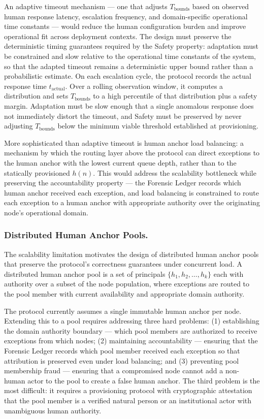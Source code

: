 An adaptive timeout mechanism — one that adjusts $T_{\mathrm{bounds}}$ based on observed human response latency, escalation frequency, and domain-specific operational time constants — would reduce the human configuration burden and improve operational fit across deployment contexts. The design must preserve the deterministic timing guarantees required by the Safety property: adaptation must be constrained and slow relative to the operational time constants of the system, so that the adapted timeout remains a deterministic upper bound rather than a probabilistic estimate. On each escalation cycle, the protocol records the actual response time $t_{\mathrm{actual}}$. Over a rolling observation window, it computes a distribution and sets $T_{\mathrm{bounds}}$ to a high percentile of that distribution plus a safety margin. Adaptation must be slow enough that a single anomalous response does not immediately distort the timeout, and Safety must be preserved by never adjusting $T_{\mathrm{bounds}}$ below the minimum viable threshold established at provisioning.

More sophisticated than adaptive timeout is human anchor load balancing: a mechanism by which the routing layer above the protocol can direct exceptions to the human anchor with the lowest current queue depth, rather than to the statically provisioned $h(n)$. This would address the scalability bottleneck while preserving the accountability property — the Forensic Ledger records which human anchor received each exception, and load balancing is constrained to route each exception to a human anchor with appropriate authority over the originating node's operational domain.

\subsubsection{Distributed Human Anchor Pools.}
The scalability limitation motivates the design of distributed human anchor pools that preserve the protocol's correctness guarantees under concurrent load. A distributed human anchor pool is a set of principals $\{h_1, h_2, \ldots, h_k\}$ each with authority over a subset of the node population, where exceptions are routed to the pool member with current availability and appropriate domain authority.

The protocol currently assumes a single immutable human anchor per node. Extending this to a pool requires addressing three hard problems: (1) establishing the domain authority boundary — which pool members are authorized to receive exceptions from which nodes; (2) maintaining accountability — ensuring that the Forensic Ledger records which pool member received each exception so that attribution is preserved even under load balancing; and (3) preventing pool membership fraud — ensuring that a compromised node cannot add a non-human actor to the pool to create a false human anchor. The third problem is the most difficult: it requires a provisioning protocol with cryptographic attestation that the pool member is a verified natural person or an institutional actor with unambiguous human authority.


